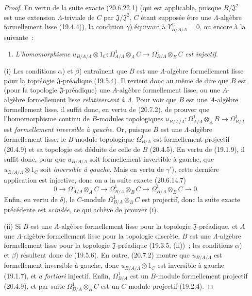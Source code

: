 \begin{proof}
En vertu de la suite exacte (20.6.22.1) (qui est applicable, puisque
$B/\mathfrak J^2$ est une extension $\Lambda$-triviale de $C$ par
$\mathfrak J/\mathfrak J^2$, $C$ étant supposée être une $\Lambda$-algèbre
formellement lisse (19.4.4)), la condition $\gamma$) équivaut à
$\Upsilon^C_{B/A/\Lambda}=0$, ou encore à la suivante~:
\begin{enumerate}
  \item[$\gamma'$)] \emph{L'homomorphisme}
  $u_{B/A/\Lambda}\otimes 1_C:\Omega^1_{A/\Lambda}\otimes_A C\to\Omega^1_{B/\Lambda}\otimes_B C$
  \emph{est injectif}.
\end{enumerate}

(i) Les conditions $\alpha$) et $\beta$) entraînent que $B$ est une
$\Lambda$-algèbre formellement lisse pour la topologie
$\mathfrak J$-préadique (19.5.4). Il revient donc au même de dire que $B$ est
(pour la topologie $\mathfrak J$-préadique) une $A$-algèbre formellement
lisse, ou une $A$-algèbre formellement lisse \emph{relativement à $\Lambda$}.
Pour voir que $B$ est une $A$-algèbre formellement lisse, il suffit donc, en
vertu de (20.7.2), de prouver que l'homomorphisme continu de $B$-modules
topologiques
$u_{B/A/\Lambda}:\Omega^1_{A/\Lambda}\otimes_A B\to\Omega^1_{B/\Lambda}$
est \emph{formellement inversible à gauche}. Or, puisque $B$ est une
$\Lambda$-algèbre formellement lisse, le $B$-module topologique
$\Omega^1_{B/\Lambda}$ est formellement projectif (20.4.9) et sa topologie
est déduite de celle de $B$ (20.4.5). En vertu de (19.1.9), il suffit donc,
pour que $u_{B/A/\Lambda}$ soit formellement inversible à gauche, que
$u_{B/A/\Lambda}\otimes 1_C$ soit \emph{inversible à gauche}. Mais en vertu de
$\gamma'$), cette dernière application est injective, donc on a la suite
exacte (20.6.14.7)
\[
  0\longrightarrow\Omega^1_{A/\Lambda}\otimes_A C
  \longrightarrow\Omega^1_{B/\Lambda}\otimes_B C
  \longrightarrow\Omega^1_{B/A}\otimes_B C\longrightarrow0.
\]
Enfin, en vertu de $\delta$), le $C$-module
$\Omega^1_{B/A}\otimes_BC$ est projectif, donc la suite exacte précédente
est \emph{scindée}, ce qui achève de prouver (i).

(ii) Si $B$ est une $A$-algèbre formellement lisse pour la topologie
$\mathfrak J$-préadique, et $A$ une $\Lambda$-algèbre formellement lisse pour
la topologie discrète, $B$ est une $\Lambda$-algèbre formellement lisse pour la
topologie $\mathfrak J$-préadique (19.3.5, (ii))~; les conditions $\alpha$) et
$\beta$) résultent donc de (19.5.6). En outre, (20.7.2) montre que
$u_{B/A/\Lambda}$ est formellement
inversible à gauche, donc
$u_{B/A/\Lambda}\otimes 1_C$ est inversible à gauche (19.1.7), et \emph{a
fortiori} injectif. Enfin, $\Omega^1_{B/A}$ est un $B$-module formellement
projectif (20.4.9), et par suite $\Omega^1_{B/A}\otimes_BC$ est un $C$-module
projectif (19.2.4).
\end{proof}

